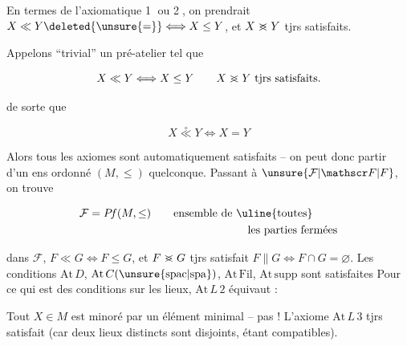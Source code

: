 En termes de l'axiomatique \textcircled{1} ou \textcircled{2}, on prendrait $X\ll Y\deleted{\unsure{=} }\Longleftrightarrow X\leq Y$, et $X\mathrel{>\mkern-13mu<}Y$ tjrs satisfaits. 

Appelons ``trivial'' un  pré-atelier tel que

\[
X\ll Y\Longleftrightarrow X\leq Y\qquad X\mathrel{>\mkern-13mu<}Y\ \text{tjrs satisfaits.}
\]

de sorte que

\[
X\overset{\circ}{\ll}Y\Longleftrightarrow X=Y
\]

Alors tous les axiomes  sont automatiquement satisfaits -- on peut donc partir d'un  ens ordonné $(M,\leq)$ quelconque. Passant à $\unsure{\mathcal F|\mathscr F|F}$, on trouve 

\[
\begin{aligned}
&\mathcal F=P\!f(M,\leq)\qquad \text{ensemble de \uline{toutes}}\\
&\hspace{15em}\text{les parties fermées}
\end{aligned}
\]



dans $\mathcal F$, $F\ll G\Longleftrightarrow F\leq G$, et $F\mathrel{>\mkern-13mu<}G$ tjrs satisfait $F\parallel G\Longleftrightarrow F\cap G=\varnothing$.  Les conditions $\mathrm{At}\,D$, $\mathrm{At}\,C(\unsure{\mathrm{spac}|\mathrm{spa}})$, $\mathrm{At}\,\mathrm{Fil}$, $\mathrm{At}\,\mathrm{supp}$ sont satisfaites Pour ce  qui est des conditions sur les lieux, $\mathrm{At}\,L\,2$ équivaut :

Tout  $X\in M$ est minoré par un élément minimal --  pas  ! L'axiome $\mathrm{At}\,L\,3$ tjrs satisfait (car deux lieux distincts sont disjoints, étant compatibles).

